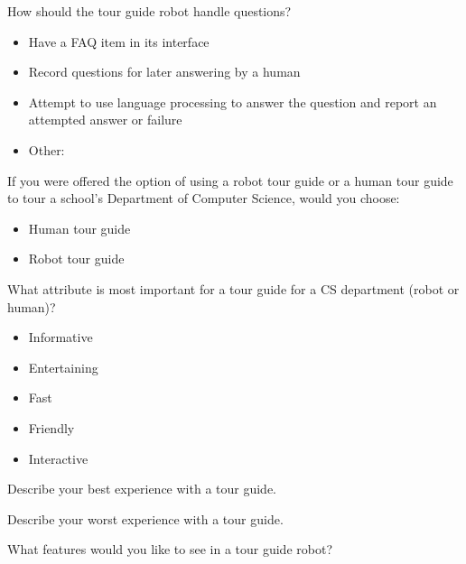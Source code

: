 \documentclass[11pt]{report}
\begin{document}
How should the tour guide robot handle questions?
\begin{itemize}
 \item Have a FAQ item in its interface
 \item Record questions for later answering by a human
 \item Attempt to use language processing to answer the question and report an attempted answer or failure
 \item Other:
\end{itemize}

If you were offered the option of using a robot tour guide or a human tour guide to tour a school's Department of Computer Science, would you choose:
\begin{itemize}
 \item Human tour guide
 \item Robot tour guide
\end{itemize}

What attribute is most important for a tour guide for a CS department (robot or human)? 
\begin{itemize}
 \item Informative
 \item Entertaining
 \item Fast
 \item Friendly
 \item Interactive
\end{itemize}

Describe your best experience with a tour guide.

Describe your worst experience with a tour guide.

What features would you like to see in a tour guide robot?
\end{document}
